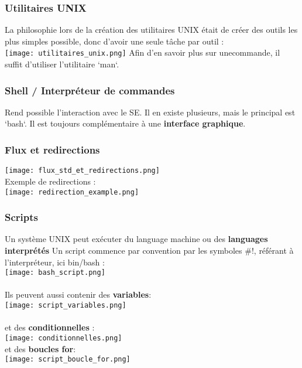 \documentclass{article}
\begin{document}
            \subsubsection{Utilitaires UNIX}
                La philosophie lors de la création des utilitaires UNIX était
                de créer des outils les plus simples possible,
                donc d'avoir une seule tâche par outil :\\
                \texttt{[image: utilitaires\_unix.png]}
                Afin d'en savoir plus sur unecommande, il suffit d'utiliser l'utilitaire `man`.
            
            \subsubsection{Shell / Interpréteur de commandes}
                Rend possible l'interaction avec le SE.
                Il en existe plusieurs, mais le principal est `bash`.
                Il est toujours complémentaire à une \textbf{interface graphique}.
            
            \subsubsection{Flux et redirections}
                \texttt{[image: flux\_std\_et\_redirections.png]}\\
                Exemple de redirections :\\
                \texttt{[image: redirection\_example.png]}
            
                \subsubsection{Scripts}
                    Un système UNIX peut exécuter du language machine ou des \textbf{languages interprétés}
                    Un script commence par convention par les symboles $\#!$, référant à l'interpréteur, ici bin/bash :\\
                    \texttt{[image: bash\_script.png]}\\\\
                    Ils peuvent aussi contenir des \textbf{variables}:\\
                    \texttt{[image: script\_variables.png]}\\\\
                    et des \textbf{conditionnelles} :\\
                    \texttt{[image: conditionnelles.png]}\\
                    et des \textbf{boucles for}:\\
                    \texttt{[image: script\_boucle\_for.png]}
\pagebreak
\end{document}
